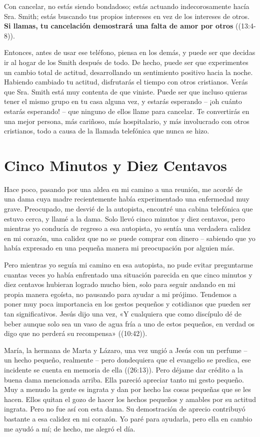 \documentclass[12pt, twoside, openright]{book}
\begin{document}
Con cancelar, no estás siendo bondadoso; estás actuando indecorosamente hacía Sra. Smith; estás buscando tus propios intereses en vez de los intereses de otros. \textbf{Si llamas, tu cancelación demostrará una falta de amor por otros} ((13:4-8)). 

Entonces, antes de usar ese teléfono, piensa en los demás, y puede ser que decidas ir al hogar de los Smith después de todo. De hecho, puede ser que experimentes un cambio total de actitud, desarrollando un sentimiento positivo hacia la noche. Habiendo cambiado tu actitud, disfrutarás el tiempo con otros cristianos. Verás que Sra. Smith está muy contenta de que viniste. Puede ser que incluso quieras tener el mismo grupo en tu casa alguna vez, y estarás esperando – ¡oh cuánto estarás esperando! – que ninguno de ellos llame para cancelar. Te convertirás en una mejor persona, más cariñoso, más hospitalario, y más involucrado con otros cristianos, todo a causa de la llamada telefónica que nunca se hizo.

\section{Cinco Minutos y Diez Centavos}
Hace poco, pasando por una aldea en mi camino a una reunión, me acordé de una dama cuya madre recientemente había experimentado una enfermedad muy grave. Preocupado, me desvié de la autopista, encontré una cabina telefónica que estuvo cerca, y llamé a la dama. Solo llevó cinco minutos y diez centavos, pero mientras yo conducía de regreso a esa autopista, yo sentía una verdadera calidez en mi corazón, una calidez que no se puede comprar con dinero – sabiendo que yo había expresado en una pequeña manera mi preocupación por alguien más.

Pero mientras yo seguía mi camino en esa autopista, no pude evitar preguntarme cuantas veces yo había enfrentado una situación parecida en que cinco minutos y diez centavos hubieran logrado mucho bien, solo para seguir andando en mi propia manera egoísta, no pausando para ayudar a mi prójimo. Tendemos a poner muy poca importancia en los gestos pequeños y cotidianos que pueden ser tan significativos. Jesús dijo una vez, «Y cualquiera que como discípulo dé de beber aunque solo sea un vaso de agua fría a uno de estos pequeños, en verdad os digo que no perderá su recompensa» ((10:42)). 

María, la hermana de Marta y Lázaro, una vez ungió a Jesús con un perfume – un hecho pequeño, realmente – pero dondequiera que el evangelio se predica, ese incidente se cuenta en memoria de ella ((26:13)).
Pero déjame dar crédito a la buena dama mencionada arriba. Ella pareció apreciar tanto mi gesto pequeño. Muy a menudo la gente es ingrata y dan por hecho las cosas pequeñas que se les hacen. Ellos quitan el gozo de hacer los hechos pequeños y amables por su actitud ingrata. Pero no fue así con esta dama. Su demostración de aprecio contribuyó bastante a esa calidez en mi corazón. Yo paré para ayudarla, pero ella en cambio me ayudó a mí; de hecho, me alegró el día.
\end{document}
